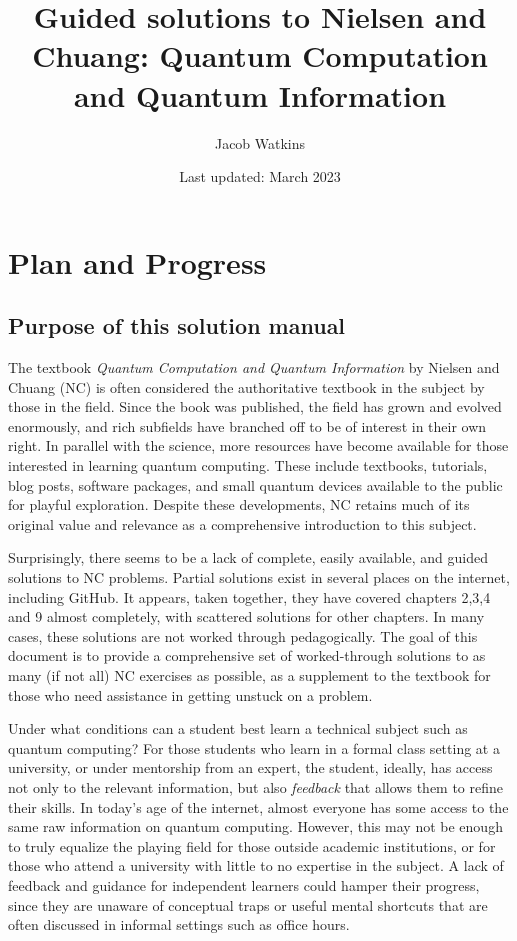 \documentclass{book}
\title{Guided solutions to Nielsen and Chuang: Quantum Computation and Quantum Information}
\author{Jacob Watkins}
\date{Last updated: March 2023}
\begin{document}
\maketitle

\setcounter{chapter}{-1}
\chapter{Plan and Progress}
\section{Purpose of this solution manual}
The textbook \emph{Quantum Computation and Quantum Information} by Nielsen and Chuang (NC) is often considered the authoritative textbook in the subject by those in the field. Since the book was published, the field has grown and evolved enormously, and rich subfields have branched off to be of interest in their own right. In parallel with the science, more resources have become available for those interested in learning quantum computing. These include textbooks, tutorials, blog posts, software packages, and small quantum devices available to the public for playful exploration. Despite these developments, NC retains much of its original value and relevance as a comprehensive introduction to this subject.

Surprisingly, there seems to be a lack of complete, easily available, and guided solutions to NC problems. Partial solutions exist in several places on the internet, including GitHub. It appears, taken together, they have covered chapters 2,3,4 and 9 almost completely, with scattered solutions for other chapters. In many cases, these solutions are not worked through pedagogically. The goal of this document is to provide a comprehensive set of worked-through solutions to as many (if not all) NC exercises as possible, as a supplement to the textbook for those who need assistance in getting unstuck on a problem.

Under what conditions can a student best learn a technical subject such as quantum computing? For those students who learn in a formal class setting at a university, or under mentorship from an expert, the student, ideally, has access not only to the relevant information, but also \emph{feedback} that allows them to refine their skills. In today's age of the internet, almost everyone has some access to the same raw information on quantum computing. However, this may not be enough to truly equalize the playing field for those outside academic institutions, or for those who attend a university with little to no expertise in the subject. A lack of feedback and guidance for independent learners could hamper their progress, since they are unaware of conceptual traps or useful mental shortcuts that are often discussed in informal settings such as office hours.
\end{document}
